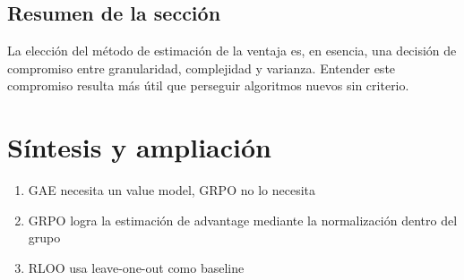 \documentclass[a4paper]{article}
\begin{document}
\subsection{Resumen de la sección}
La elección del método de estimación de la ventaja es, en esencia, una decisión de compromiso entre granularidad, complejidad y varianza. Entender este compromiso resulta más útil que perseguir algoritmos nuevos sin criterio.

\newpage
\section{Síntesis y ampliación}
\begin{enumerate}
  \item GAE necesita un value model, GRPO no lo necesita
  \item GRPO logra la estimación de advantage mediante la normalización dentro del grupo
  \item RLOO usa leave-one-out como baseline
\end{enumerate}
\end{document}
